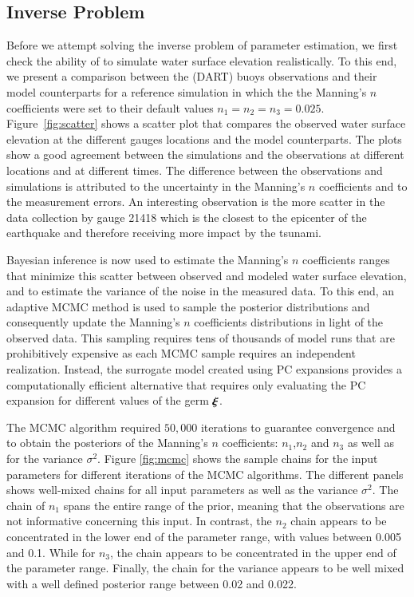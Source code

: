 \subsection{Inverse Problem} 
\label{sec:inverse}

Before we attempt solving the inverse problem of parameter estimation, 
we first check the ability of \geoclaw to simulate water surface elevation
realistically. To this end, we present a comparison between the 
(DART) buoys observations  and their \geoclaw model counterparts
for a reference simulation in which the  the Manning's $n$ coefficients were set to their default values $n_1=n_2=n_3=0.025$. Figure~\ref{fig:scatter} 
shows a scatter plot that compares the observed 
water surface elevation at the different gauges locations and the  \geoclaw model counterparts. 
The plots show a good agreement between the simulations and the 
observations at different locations and at different times. 
The difference between the observations and simulations is attributed to the uncertainty in the 
Manning's $n$ coefficients and to the measurement errors.
An interesting observation is the more scatter in the data collection by gauge 21418 which is the closest to
the epicenter of the earthquake and therefore receiving more impact by the tsunami.

Bayesian inference is now used to estimate the Manning's 
$n$ coefficients ranges that minimize this scatter between 
observed and modeled water surface elevation, and to estimate the variance of the noise in the measured data.
To this end, an adaptive MCMC method is used to sample 
the posterior distributions \citep{Gareth2009,Haario2001} and consequently 
update the Manning's $n$ coefficients distributions in light of the 
observed data. This sampling requires tens of thousands of 
\geoclaw model runs that are prohibitively expensive as each MCMC 
sample requires an independent \geoclaw realization. Instead,
the surrogate model created using PC expansions provides a computationally
efficient alternative that requires only evaluating the PC expansion
for different values of the germ $\xxi$.

The MCMC algorithm required $50,000$ iterations to guarantee convergence
and to obtain the posteriors of the Manning's $n$ coefficients: 
$n_1$,$n_2$ and $n_3$ as well as for the variance $\sigma^2$. Figure \ref{fig:mcmc} 
shows the sample chains for the input parameters for different iterations of the MCMC algorithms. 
The different panels shows well-mixed chains for all input parameters as well as the variance $\sigma^2$.
The chain of  $n_{1}$ spans the entire range of the prior, meaning that the observations are not informative 
concerning this input.  In contrast, the $n_{2}$ chain appears to be concentrated in the 
lower end of the parameter range, with values between 0.005 and 0.1. 
While for $n_{3}$, the chain appears to be concentrated in the 
upper end of the parameter range. Finally, the chain for the variance 
appears to be well mixed with a well defined posterior range between 0.02 and 0.022.


